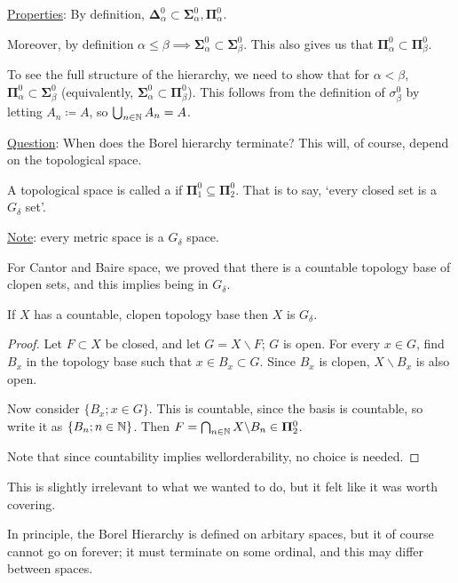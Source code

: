\documentclass[]{article}
\newcommand{\bosig}{\bm{\Sigma}}
\newcommand{\bopi}{\bm{\Pi}}
\newcommand{\bodel}{\bm{\Delta}}
\begin{document}
\underline{Properties}: By definition, $\bodel ^0_\alpha \subset \bosig^0_\alpha,\bopi^0_\alpha$.

Moreover, by definition $\alpha \le \beta \implies \bosig^0_\alpha \subset \bosig^0_\beta$. This also gives us that $\bopi^0_\alpha \subset \bopi^0_\beta$.

To see the full structure of the hierarchy, we need to show that for $\alpha < \beta$, $\bopi^0_\alpha \subset \bosig^0_\beta$ (equivalently, $\bosig^0_\alpha \subset \bopi^0_\beta$). This follows from the definition of $\sigma^0_\beta$ by letting $A_n\coloneqq A$, so $\bigcup_{n\in \mathbb{N}}A_n = A$.

\underline{Question}: When does the Borel hierarchy terminate? This will, of course, depend on the topological space.


\begin{defin*}
    A topological space is called a  if $\bopi^0_1 \subseteq \bopi^0_2$. That is to say, `every closed set is a $G_\delta$ set'.
\end{defin*}

\underline{Note}: every metric space is a $G_\delta$ space.

For Cantor and Baire space, we proved that there is a countable topology base of clopen sets, and this implies being in $G_\delta$.

\begin{remark*}[Proposition]
    If $X$ has a countable, clopen topology base then $X$ is $G_\delta$.
\end{remark*}
\begin{proof}
    Let $F\subset X$ be closed, and let $G = X\backslash F$; $G$ is open. For every $x \in G$, find $B_x$ in the topology base such that $x \in B_x\subset G$. Since $B_x$ is clopen, $X\backslash B_x$ is also open.

    Now consider $\{B_x ; x \in G\}$. This is countable, since the basis is countable, so write it as $\{B_n; n\in \mathbb{N}\}$. Then $F = \bigcap_{n\in\N}X\backslash B_n \in \bopi_2^0$.

    Note that since countability implies wellorderability, no choice is needed.
\end{proof}

This is slightly irrelevant to what we wanted to do, but it felt like it was worth covering.

In principle, the Borel Hierarchy is defined on arbitary spaces, but it of course cannot go on forever; it must terminate on some ordinal, and this may differ between spaces.
\end{document}
